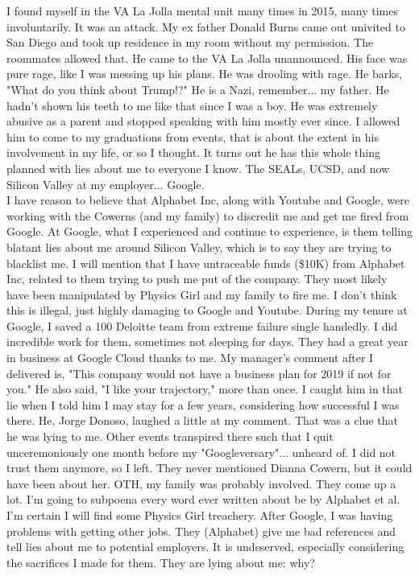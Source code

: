 \documentclass[a4paper]{arthur-letter}
\begin{document}
\begin{letter}
            I found myself in the VA La Jolla mental unit many times in 2015, many times involuntarily. It was an attack. My ex father Donald Burns came out univited to San Diego and took up residence in my room without my permission. The roommates allowed that. He came to the VA La Jolla unannounced. His face was pure rage, like I was messing up his plans. He was drooling with rage. He barks, "What do you think about Trump!?" He is a Nazi, remember... my father. He hadn't shown his teeth to me like that since I was a boy. He was extremely abusive as a parent and stopped speaking with him mostly ever since. I allowed him to come to my graduations from events, that is about the extent in his involvement in my life, or so I thought. It turns out he has this whole thing planned with lies about me to everyone I know. The SEALs, UCSD, and now Silicon Valley at my employer... Google. \\
            
            I have reason to believe that Alphabet Inc, along with Youtube and Google, were working with the Cowerns (and my family) to discredit me and get me fired from Google. At Google, what I experienced and continue to experience, is them telling blatant lies about me around Silicon Valley, which is to say they are trying to blacklist me. I will mention that I have untraceable funds (\$10K) from Alphabet Inc, related to them trying to push me put of the company. They most likely have been manipulated by Physics Girl and my family to fire me. I don't think this is illegal, just highly damaging to Google and Youtube. During my tenure at Google, I saved a 100 Deloitte team from extreme failure single handedly. I did incredible work for them, sometimes not sleeping for days. They had a great year in business at Google Cloud thanks to me. My manager's comment after I delivered is, "This company would not have a business plan for 2019 if not for you." He also said, "I like your trajectory," more than once. I caught him in that lie when I told him I may stay for a few years, considering how successful I was there. He, Jorge Donoso, laughed a little at my comment. That was a clue that he was lying to me. Other events transpired there such that I quit unceremoniously one month before my "Googleversary"... unheard of. I did not trust them anymore, so I left. They never mentioned Dianna Cowern, but it could have been about her. OTH, my family was probably involved. They come up a lot. I'm going to subpoena every word ever written about be by Alphabet et al. I'm certain I will find some Physics Girl treachery. After Google, I was having problems with getting other jobs. They (Alphabet) give me bad references and tell lies about me to potential employers. It is undeserved, especially considering the sacrifices I made for them. They are lying about me:  why? \\
            

\end{letter}
\end{document}
